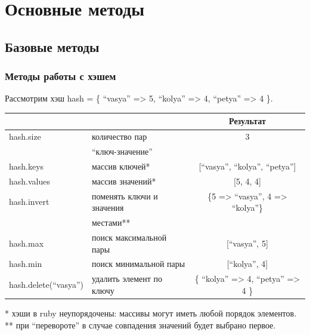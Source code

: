 \documentclass[compress,red]{beamer}
\begin{document}
\section{Основные методы}

\subsection{Базовые методы}
\begin{frame}[fragile]
  \frametitle{Методы работы с хэшем}
    \scriptsize{
  	  Рассмотрим хэш hash = \{ ``vasya'' => 5, ``kolya'' => 4, ``petya'' => 4 \}.
		}
		\newline
		
		\scriptsize{
		\begin{tabular}{|l|l|c|}
		\hline
		\centering{\textbf{Метод}} & \centering{\textbf{Описание}} & \textbf{Результат}\\
		\hline
		hash.size & количество пар & 3 \\
		          & ``ключ-значение'' & \\
		\hline
		hash.keys & массив ключей* & [``vasya'', ``kolya'', ``petya''] \\
		\hline
		hash.values & массив значений* & [5, 4, 4] \\
		\hline
		hash.invert & поменять ключи и значения & \{5 => ``vasya'', 4 => ``kolya''\} \\
		            & местами** & \\
		\hline
		hash.max & поиск максимальной пары & [``vasya'', 5] \\
		\hline
		hash.min & поиск минимальной пары & [``kolya'', 4] \\
		\hline
		hash.delete(``vasya'') & удалить элемент по ключу & \{ ``kolya'' => 4, ``petya'' => 4 \} \\
		\hline
		\end{tabular} }
		
		* хэши в ruby неупорядочены: массивы могут иметь любой порядок элементов.
		** при ``перевороте'' в случае совпадения значений будет выбрано первое.
\end{frame}
\end{document}
